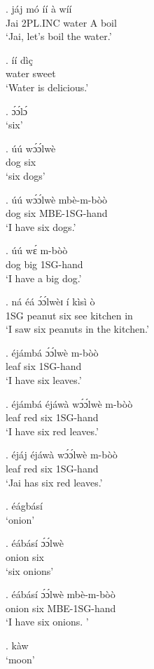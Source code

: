\documentclass{assets/fieldnotes}
\begin{document}

\exg. jáj mó íí à wíí \\
Jai 2PL.INC water A boil \\
`Jai, let's boil the water.'

\exg. íí dìç\\
water sweet \\
`Water is delicious.'


\ex. ɔ́ɔ́lɔ́\\ 
`six'

\exg. úú wɔ́ɔ́lwè \\
dog six \\
`six dogs'

\exg. úú wɔ́ɔ́lwè mbè-m-bòò \\
dog six MBE-1SG-hand\\
`I have six dogs.'

\exg. úú wɛ́ m-bòò\\
dog big 1SG-hand\\
`I have a big dog.'

\exg. ná éá ɔ́ɔ́lwèɪ í kìsì ò\\
1SG peanut six see kitchen in\\
`I saw six peanuts in the kitchen.'

\exg. éjámbá ɔ́ɔ́lwè m-bòò\\
leaf six 1SG-hand \\
`I have six leaves.'

\exg. éjámbá éjáwà wɔ́ɔ́lwè m-bòò\\
leaf red six 1SG-hand \\
`I have six red leaves.'

\exg. éjáj   éjáwà wɔ́ɔ́lwè m-bòò\\
leaf red six 1SG-hand \\
`Jai has six red leaves.'

\ex. éágbásí\\
`onion'

\exg. éábásí ɔ́ɔ́lwè\\
onion six \\
`six onions'

\exg. éábásí ɔ́ɔ́lwè mbè-m-bòò \\
onion six MBE-1SG-hand \\
`I have six onions. '

\ex. kàw \\
`moon'
\end{document}
